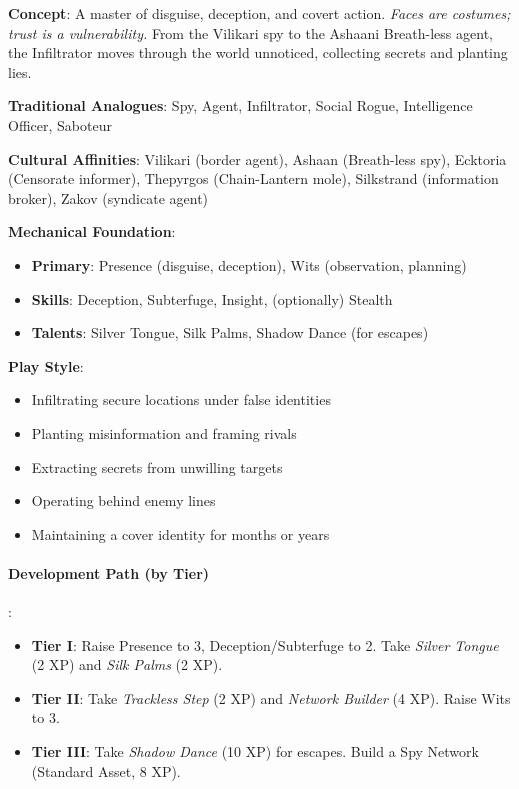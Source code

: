 \textbf{Concept}: A master of disguise, deception, and covert action. \emph{Faces are costumes; trust is a vulnerability.} From the Vilikari spy to the Ashaani Breath-less agent, the Infiltrator moves through the world unnoticed, collecting secrets and planting lies.

\textbf{Traditional Analogues}: Spy, Agent, Infiltrator, Social Rogue, Intelligence Officer, Saboteur

\textbf{Cultural Affinities}: Vilikari (border agent), Ashaan (Breath-less spy), Ecktoria (Censorate informer), Thepyrgos (Chain-Lantern mole), Silkstrand (information broker), Zakov (syndicate agent)

\textbf{Mechanical Foundation}:
\begin{itemize}
\item \textbf{Primary}: Presence (disguise, deception), Wits (observation, planning)
\item \textbf{Skills}: Deception, Subterfuge, Insight, (optionally) Stealth
\item \textbf{Talents}: Silver Tongue, Silk Palms, Shadow Dance (for escapes)
\end{itemize}

\textbf{Play Style}:
\begin{itemize}
\item Infiltrating secure locations under false identities
\item Planting misinformation and framing rivals
\item Extracting secrets from unwilling targets
\item Operating behind enemy lines
\item Maintaining a cover identity for months or years
\end{itemize}

\paragraph{Development Path (by Tier)}:
\begin{itemize}
\item \textbf{Tier I}: Raise Presence to 3, Deception/Subterfuge to 2. Take \emph{Silver Tongue} (2 XP) and \emph{Silk Palms} (2 XP).
\item \textbf{Tier II}: Take \emph{Trackless Step} (2 XP) and \emph{Network Builder} (4 XP). Raise Wits to 3.
\item \textbf{Tier III}: Take \emph{Shadow Dance} (10 XP) for escapes. Build a Spy Network (Standard Asset, 8 XP).
\end{itemize}

